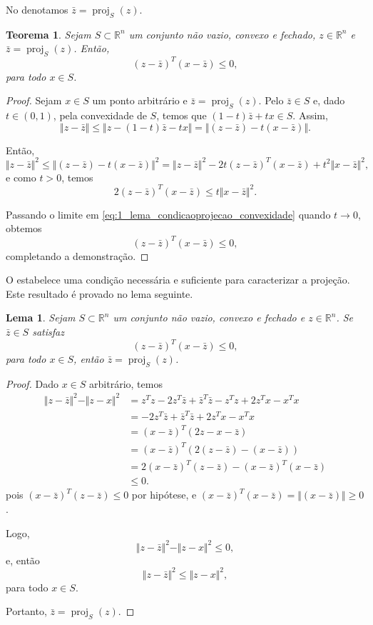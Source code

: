 \documentclass[12pt,a4paper]{scrartcl}
\DeclareMathOperator{\proj}{proj}
\def\RR{\mathds{R}}
\newtheorem{teo}{Teorema}
\newtheorem{lema}{Lema}
\theoremstyle{definition}%
\begin{document}
No  denotamos $\bar{z} = \proj_{S} (z)$.


\begin{teo}  \label{lema_condicaoprojecao_convexidade}
Sejam $S \subset \RR^{n}$ um conjunto não vazio, convexo e fechado, $z \in \RR^{n}$ e $\bar{z} = \proj_{S} (z)$. Então, 
\[
(z - \bar{z})^{T}(x - \bar{z}) \leq 0 ,
\]
para todo $x \in S$.
\end{teo}
\begin{proof}
Sejam $x \in S$ um ponto arbitrário e $\bar{z} = \proj_{S} (z)$. Pelo  $\bar{z} \in S$ e, dado $t \in (0,1)$, pela convexidade de $S$, temos que $(1-t)\bar{z} + tx \in S$. Assim, 
\[
\Vert z-\bar{z} \Vert \leq \Vert z-(1-t)\bar{z} - tx \Vert = \Vert (z-\bar{z}) - t(x-\bar{z}) \Vert.
\]

Então, 
\[
\Vert z-\bar{z} \Vert^{2} \leq \Vert (z-\bar{z}) - t(x-\bar{z}) \Vert^{2} = \Vert z-\bar{z} \Vert^{2} - 2t(z-\bar{z})^{T}(x-\bar{z}) + t^{2}\Vert x- \bar{z} \Vert^{2} ,
\]
e como $t>0$, temos
\[ \label{eq:1_lema_condicaoprojecao_convexidade}
2(z-\bar{z})^{T}(x-\bar{z}) \leq t \Vert x- \bar{z} \Vert^{2} .
\]

Passando o limite em \eqref{eq:1_lema_condicaoprojecao_convexidade} quando $t\rightarrow 0$, obtemos
\[
(z-\bar{z})^{T}(x-\bar{z}) \leq 0, 
\]
completando a demonstração.
\end{proof}


O  estabelece uma condição necessária e suficiente para caracterizar a projeção. Este resultado é provado no lema seguinte.


\begin{lema} \label{lema:defineprojecao_convexidade}
Sejam $S \subset \RR^{n}$ um conjunto não vazio, convexo e fechado e $z \in \RR^{n}$. Se $\bar{z} \in S$ satisfaz
\[
(z - \bar{z})^{T}(x - \bar{z}) \leq 0 ,
\]
para todo $x \in S$, então $\bar{z} = \proj_{S} (z)$.
\end{lema}
\begin{proof}
Dado $x\in S$ arbitrário, temos
\begin{align}
\Vert z-\bar{z} \Vert^{2} - \Vert z-x \Vert^{2} & = z^{T}z - 2z^{T}\bar{z} + \bar{z}^{T}\bar{z} - z^{T}z + 2z^{T}x - x^{T}x \\
& = - 2z^{T}\bar{z} + \bar{z}^{T}\bar{z} + 2z^{T}x - x^{T}x \\
& = (x-\bar{z})^{T}(2z-x-\bar{z}) \\
& = (x-\bar{z})^{T}(2(z-\bar{z})-(x-\bar{z})) \\
& = 2(x-\bar{z})^{T}(z-\bar{z}) - (x-\bar{z})^{T}(x-\bar{z}) \\
& \leq 0 .
\end{align}
pois $(x-\bar{z})^{T}(z-\bar{z}) \leq 0$ por hipótese, e $(x-\bar{z})^{T}(x-\bar{z}) = \Vert (x-\bar{z}) \Vert \geq 0$.

Logo,
\[
\Vert z-\bar{z} \Vert^{2} - \Vert z-x \Vert^{2} \leq 0,
\]
e, então
\[
\Vert z-\bar{z} \Vert^{2} \leq \Vert z-x \Vert^{2} ,
\]
para todo $x\in S$.

Portanto, $\bar{z} = \proj_{S} (z)$.
\end{proof}
\end{document}
